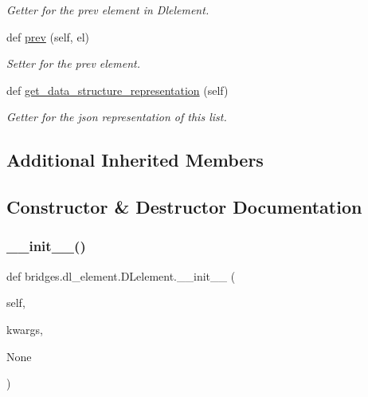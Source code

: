 \begin{DoxyCompactItemize}
\begin{DoxyCompactList}\small\item\em Getter for the prev element in Dlelement. \end{DoxyCompactList}\item 
def \mbox{\hyperlink{classbridges_1_1dl__element_1_1_d_lelement_a17c371ec0c38e9555e55551d9be4d185}{prev}} (self, el)
\begin{DoxyCompactList}\small\item\em Setter for the prev element. \end{DoxyCompactList}\item 
def \mbox{\hyperlink{classbridges_1_1dl__element_1_1_d_lelement_abcae653ca8e9590c594910bad148ddf2}{get\+\_\+data\+\_\+structure\+\_\+representation}} (self)
\begin{DoxyCompactList}\small\item\em Getter for the json representation of this list. \end{DoxyCompactList}\end{DoxyCompactItemize}
\subsection*{Additional Inherited Members}


\subsection{Constructor \& Destructor Documentation}
\mbox{\label{classbridges_1_1dl__element_1_1_d_lelement_a1ade3543dee3c48d6030125b37f993bb}} 
\subsubsection{\texorpdfstring{\+\_\+\+\_\+init\+\_\+\+\_\+()}{\_\_init\_\_()}}
{\footnotesize\ttfamily def bridges.\+dl\+\_\+element.\+D\+Lelement.\+\_\+\+\_\+init\+\_\+\+\_\+ (\begin{DoxyParamCaption}\item[{}]{self,  }\item[{}]{kwargs,  }\item[{}]{None }\end{DoxyParamCaption})}




